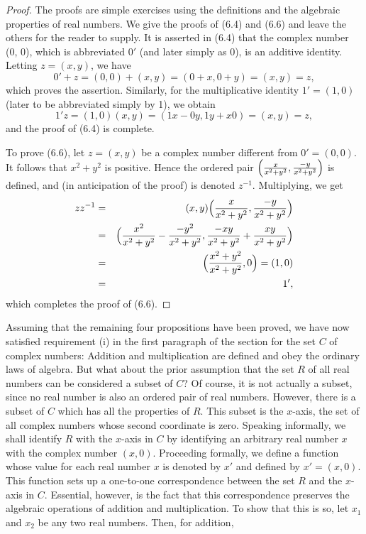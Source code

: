 \begin{proof}
The proofs are simple exercises using the definitions and the algebraic properties of real
numbers. We give the proofs of (6.4) and (6.6) and leave the others for the reader to supply. It
is asserted in (6.4) that the complex number (0, 0), which is abbreviated $0'$ (and later simply
as 0), is an additive identity. Letting $z = (x, y)$, we have
$$
0'+ z = (0,0) + (x, y) = (0 + x, 0 + y) = (x, y) = z,
$$
\noindent which proves the assertion. Similarly, for the multiplicative identity $1' = (1, 0)$ (later to be
abbreviated simply by 1), we obtain
$$
1'z = (1, 0)(x, y) = (1x - 0y, 1y + x0) = (x, y) = z,
$$
\noindent and the proof of (6.4) is complete.

To prove (6.6), let $z= (x,y)$ be a complex number different from $0' = (0, 0)$. It follows that $x^2
+ y^2$ is positive. Hence the ordered pair $\Bigl(\frac{x}{x^2 + y^2}, \frac{-y}{x^2 + y^2}\Bigr)$ is defined, and (in anticipation of the proof) is denoted $z^{-1}$. Multiplying, we get 
\begin{eqnarray*}
zz^{-1} &=& (x, y) \Bigl(\frac{x}{x^2 + y^2}, \frac{-y}{ x^2 + y^2} \Bigr)\\
&=& \Bigl(\frac{x^2}{x^2 + y^2} - \frac{-y^2}{ x^2 + y^2}, \frac{-xy}{x^2 + y^2} + \frac{xy}{x^2  + y^2}\Bigr)\\
&=& \Bigl(\frac{x^2 + y^2}{x^2 + y^2}, 0\Bigr) = (1,0)\\
&=& 1',
\end{eqnarray*}
which completes the proof of (6.6).
\end{proof}

Assuming that the remaining four propositions have been proved, we have now satisfied requirement (i) in the first paragraph of the section for the set $C$ of complex numbers: 
Addition and multiplication are defined and obey the ordinary laws of algebra. But what about the prior assumption that the set $R$ of all real numbers can be considered a subset of $C$? 
Of course, it is not actually a subset, since no real number is also an ordered pair of real numbers. However, there is a subset of $C$ which has all the properties of $R$. This subset is the $x$-axis, the set of all complex numbers whose second coordinate is zero. Speaking informally, we shall identify $R$ with the $x$-axis in $C$ by identifying an arbitrary real number $x$ with the complex number $(x, 0)$. Proceeding formally, we define a function whose value for each real number $x$ is denoted by $x'$ and defined by $x' = (x, 0)$. This function sets up a one-to-one correspondence between the set $R$ and the $x$-axis in $C$. Essential, however, is the fact that this correspondence preserves the algebraic operations of addition and multiplication. To show that this is so, let $x_{1}$ and $x_{2}$ be any two real numbers. Then, for addition,


